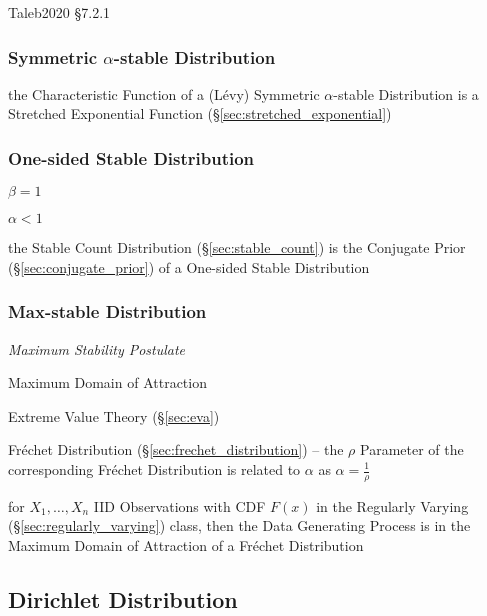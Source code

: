 Taleb2020 \S 7.2.1



\subsubsection{Symmetric $\alpha$-stable Distribution}
\label{sec:symmetric_alpha_stable}

the Characteristic Function of a (L\'evy) Symmetric $\alpha$-stable Distribution
is a Stretched Exponential Function (\S\ref{sec:stretched_exponential})



\subsubsection{One-sided Stable Distribution}\label{sec:onesided_stable}

$\beta = 1$

$\alpha < 1$

the Stable Count Distribution (\S\ref{sec:stable_count}) is the Conjugate Prior
(\S\ref{sec:conjugate_prior}) of a One-sided Stable Distribution



\subsubsection{Max-stable Distribution}\label{sec:max_stable}

\emph{Maximum Stability Postulate}

Maximum Domain of Attraction

\fist Extreme Value Theory (\S\ref{sec:eva})

Fr\'echet Distribution (\S\ref{sec:frechet_distribution}) -- the $\rho$
Parameter of the corresponding Fr\'echet Distribution is related to $\alpha$ as
$\alpha = \frac{1}{\rho}$

for $X_1, \ldots, X_n$ IID Observations with CDF $F(x)$ in the Regularly Varying
(\S\ref{sec:regularly_varying}) class, then the Data Generating Process is in
the Maximum Domain of Attraction of a Fr\'echet Distribution



\subsection{Dirichlet Distribution}\label{sec:dirichlet_distribution}

